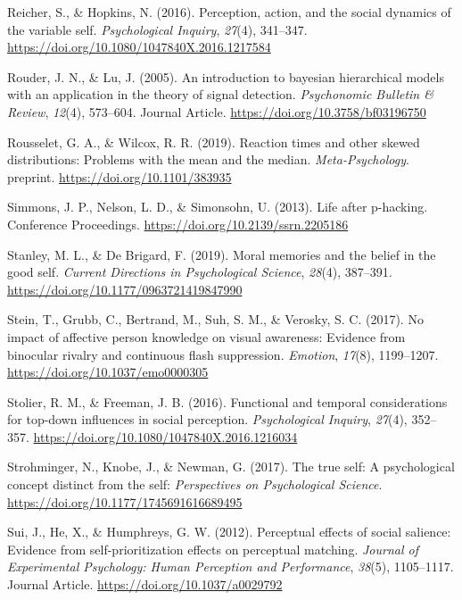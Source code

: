 \documentclass[
  english,
  man]{apa6}
\begin{document}
\leavevmode\hypertarget{ref-reicher_perception_2016}{}%
Reicher, S., \& Hopkins, N. (2016). Perception, action, and the social dynamics of the variable self. \emph{Psychological Inquiry}, \emph{27}(4), 341--347. \url{https://doi.org/10.1080/1047840X.2016.1217584}

\leavevmode\hypertarget{ref-Rouder_2005_BHM_SDT}{}%
Rouder, J. N., \& Lu, J. (2005). An introduction to bayesian hierarchical models with an application in the theory of signal detection. \emph{Psychonomic Bulletin \& Review}, \emph{12}(4), 573--604. Journal Article. \url{https://doi.org/10.3758/bf03196750}

\leavevmode\hypertarget{ref-Rousselet_2019}{}%
Rousselet, G. A., \& Wilcox, R. R. (2019). Reaction times and other skewed distributions: Problems with the mean and the median. \emph{Meta-Psychology}. preprint. \url{https://doi.org/10.1101/383935}

\leavevmode\hypertarget{ref-Simmons_2013_life}{}%
Simmons, J. P., Nelson, L. D., \& Simonsohn, U. (2013). Life after p-hacking. Conference Proceedings. \url{https://doi.org/10.2139/ssrn.2205186}

\leavevmode\hypertarget{ref-stanley_moral_2019}{}%
Stanley, M. L., \& De Brigard, F. (2019). Moral memories and the belief in the good self. \emph{Current Directions in Psychological Science}, \emph{28}(4), 387--391. \url{https://doi.org/10.1177/0963721419847990}

\leavevmode\hypertarget{ref-stein_no_2017}{}%
Stein, T., Grubb, C., Bertrand, M., Suh, S. M., \& Verosky, S. C. (2017). No impact of affective person knowledge on visual awareness: Evidence from binocular rivalry and continuous flash suppression. \emph{Emotion}, \emph{17}(8), 1199--1207. \url{https://doi.org/10.1037/emo0000305}

\leavevmode\hypertarget{ref-stolier_functional_2016}{}%
Stolier, R. M., \& Freeman, J. B. (2016). Functional and temporal considerations for top-down influences in social perception. \emph{Psychological Inquiry}, \emph{27}(4), 352--357. \url{https://doi.org/10.1080/1047840X.2016.1216034}

\leavevmode\hypertarget{ref-strohminger_true_2017}{}%
Strohminger, N., Knobe, J., \& Newman, G. (2017). The true self: A psychological concept distinct from the self: \emph{Perspectives on Psychological Science}. \url{https://doi.org/10.1177/1745691616689495}

\leavevmode\hypertarget{ref-Sui_2012_JEPHPP}{}%
Sui, J., He, X., \& Humphreys, G. W. (2012). Perceptual effects of social salience: Evidence from self-prioritization effects on perceptual matching. \emph{Journal of Experimental Psychology: Human Perception and Performance}, \emph{38}(5), 1105--1117. Journal Article. \url{https://doi.org/10.1037/a0029792}
\end{document}
